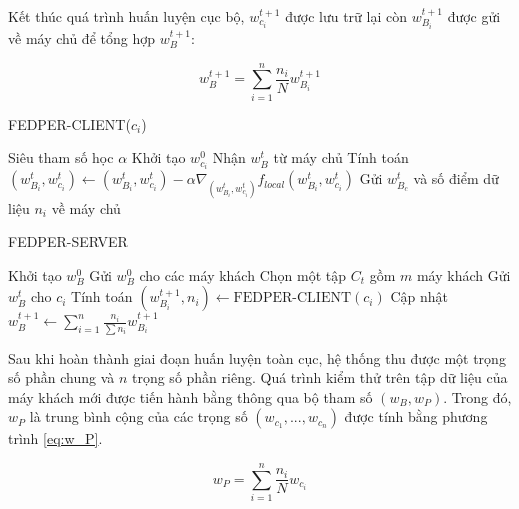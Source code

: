 Kết thúc quá trình huấn luyện cục bộ, $w_{c_i}^{t+1}$ được lưu trữ lại còn $w_{B_i}^{t+1}$ được gửi về máy chủ để tổng hợp $w_{B}^{t+1}$:

\begin{equation}
    w_B^{t+1} = \sum_{i=1}^n{\frac{n_i}{N}w_{B_i}^{t+1}}
\end{equation}

\begin{algorithm}[H]
    \caption{FEDPER-CLIENT($c_i$) \cite{arivazhagan2019federated}} \label{alg:fedper_client}
    \begin{algorithmic}[1]
        \Require Siêu tham số học $\alpha$
        \State Khởi tạo $w_{c_i}^0$
        \State Nhận $w_B^{t}$ từ máy chủ
        \State Tính toán $(w_{B_i}^{t}, w_{c_i}^{t}) \gets (w_{B_i}^{t}, w_{c_i}^{t}) - \alpha\nabla_{(w_{B_i}^{t}, w_{c_i}^{t})} f_{local}(w_{B_i}^{t}, w_{c_i}^{t})$
        \State Gửi $w_{B_c}^{t}$ và số điểm dữ liệu $n_i$ về máy chủ
    \end{algorithmic}
\end{algorithm}

\begin{algorithm}[H]
    \caption{FEDPER-SERVER \cite{arivazhagan2019federated}} \label{alg:fedper_server}
    \begin{algorithmic}[1]
        \State Khởi tạo $w_{B}^{0}$
        \State Gửi $w_{B}^{0}$ cho các máy khách
            \State Chọn một tập $C_t$ gồm $m$ máy khách
                \State Gửi $w_B^{t}$ cho $c_i$
                \State Tính toán $(w_{B_i}^{t+1}, n_i) \gets \text{FEDPER-CLIENT}(c_i)$
            \EndFor
            \State Cập nhật $w_B^{t+1} \gets \sum_{i=1}^n \frac{n_i}{\sum n_i} w_{B_i}^{t+1}$
        \EndFor
    \end{algorithmic}
\end{algorithm}

Sau khi hoàn thành giai đoạn huấn luyện toàn cục, hệ thống thu được một trọng số phần chung và $n$ trọng số phần riêng. Quá trình kiểm thử trên tập dữ liệu của máy khách mới được tiến hành bằng thông qua bộ tham số $(w_B, w_P)$. Trong đó, $w_P$ là trung bình cộng của các trọng số $(w_{c_1},...,w_{c_n})$ được tính bằng phương trình \ref{eq:w_P}.

\begin{dmath}
    \label{eq:w_P}
    w_P = \sum_{i=1}^n \frac{n_i}{N}w_{c_i}
\end{dmath}

